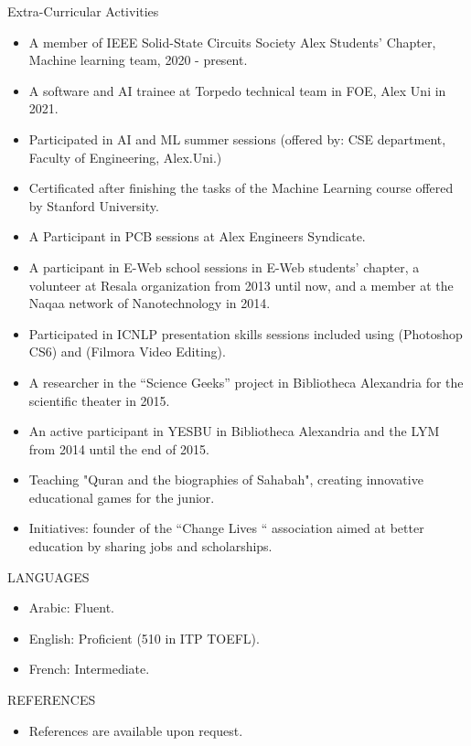 \documentclass{resume} %
\begin{document}
\begin{rSection}{Extra-Curricular Activities} 
\begin{itemize}
    
    \item A member of IEEE Solid-State Circuits Society Alex Students' Chapter, Machine learning team, 2020 - present.
     \item A software and AI trainee at Torpedo technical team in FOE, Alex Uni in 2021.
    \item 	Participated in AI and ML summer sessions (offered by: CSE department, Faculty of Engineering, Alex.Uni.)
    \item   Certificated after finishing the tasks of the Machine Learning course offered by Stanford University.
    \item A Participant in PCB sessions at Alex Engineers Syndicate.
    \item A participant in E-Web school sessions in E-Web students' chapter, a volunteer at Resala organization from 2013 until now, and a member at the Naqaa network of Nanotechnology in 2014.
    \item Participated in ICNLP presentation skills sessions included using (Photoshop CS6) and (Filmora Video Editing).

    \item A researcher in the “Science Geeks” project in Bibliotheca Alexandria for the scientific theater in 2015.
    \item An active participant in YESBU in Bibliotheca Alexandria and the LYM from 2014 until the end of 2015.
    \item Teaching "Quran and the biographies of Sahabah", creating innovative educational games for the junior.
    \item Initiatives: founder of the “Change Lives “ association aimed at better education by sharing jobs and scholarships.
\end{itemize}


\end{rSection}

\begin{rSection}{LANGUAGES} 
\begin{itemize}
    \item 	Arabic: Fluent.
    \item   English: Proficient (510 in ITP TOEFL).
    \item   French: Intermediate.
\end{itemize}
\end{rSection}




\begin{rSection}{REFERENCES} 
\begin{itemize}
    \item 	References are available upon request.
\end{itemize}


\end{rSection}
\end{document}

